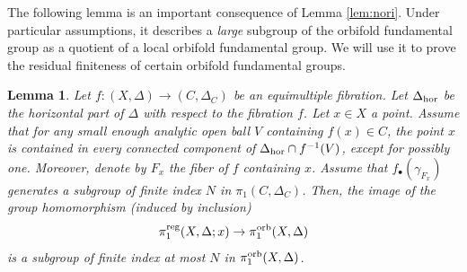 \documentclass{amsart}
\newtheorem{lemma}[theorem]{Lemma}
\theoremstyle{definition}
\theoremstyle{remark}
\numberwithin{equation}{section}
\begin{document}
The following lemma is an important consequence of Lemma \ref{lem:nori}. Under particular assumptions, it describes a {\em large} subgroup of the orbifold fundamental group as a quotient of a local orbifold fundamental group. We will use it to prove the residual finiteness of certain orbifold fundamental groups.

\begin{lemma}\label{lem:Nori-reg-fun}
Let $f:(X,\Delta)\to (C,\Delta_C)$ be an equimultiple fibration.
Let $\Delta_{\rm hor}$ be the horizontal part of $\Delta$ with respect to the fibration $f$.
Let $x\in X$ a point. Assume that for any small enough analytic open ball $V$ containing $f(x)\in C$, the point $x$ is contained in every connected component of $\Delta_{\rm hor}\cap f^{-1}(V)$, except for possibly one.
Moreover, denote by $F_x$ the fiber of $f$ containing $x$. Assume that  $f_{\bullet}(\gamma_{F_x})$ generates a subgroup of finite index $N$ in $\pi_1(C,\Delta_C)$.
Then, the image of the group homomorphism (induced by inclusion)
\[
\pi_1^{\rm reg}(X,\Delta;x)\rightarrow
\pi_1^{\rm orb}(X,\Delta)
\]
is a subgroup of finite index at most $N$ in $\pi_1^{\rm orb}(X,\Delta)$.
\end{lemma}
\end{document}
